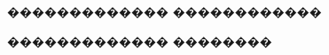 \documentclass[a4paper]{article}
\begin{document}
\begin{figure}[h!]
  \noindent{}
  \caption{������������� ������������}
  \label{expex}
\end{figure}

\begin{figure}[h!]
  \noindent{}
  \caption{������������� ��������}
  \label{mon}
\end{figure}
\end{document}
